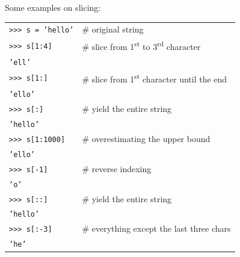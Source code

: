 \documentclass[t,handout,9pt]{beamer}
\begin{document}
\begin{frame}
\vfill
Some examples on slicing:
\begin{table}[]
\begin{flushleft}
\begin{tabular}{ll}
\texttt{>{}>{}> s = 'hello'} &  \# original string\\
\texttt{>{}>{}> s[1:4]} &  \# slice from 1\textsuperscript{st} to 3\textsuperscript{rd} character\\
\texttt{'ell'} & \\
\texttt{>{}>{}> s[1:]} &  \# slice from 1\textsuperscript{st} character until the end\\
\texttt{'ello'} & \\
\texttt{>{}>{}> s[:]} &  \# yield the entire string\\
\texttt{'hello'} & \\
\texttt{>{}>{}> s[1:1000]} &  \# overestimating the upper bound\\
\texttt{'ello'} & \\
\texttt{>{}>{}> s[-1]} &  \# reverse indexing\\
\texttt{'o'} & \\
\texttt{>{}>{}> s[::]} &  \# yield the entire string\\
\texttt{'hello'} & \\
\texttt{>{}>{}> s[:-3]} &  \# everything except the last three chars\\
\texttt{'he'} & \\
\end{tabular}
\end{flushleft}
\end{table}
\vfill
\end{frame}
%
\end{document}
